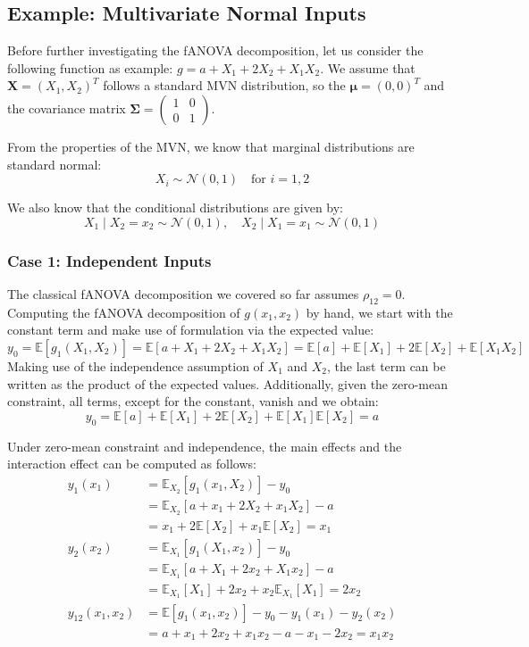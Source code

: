 \subsection{Example: Multivariate Normal Inputs}

Before further investigating the fANOVA decomposition, let us consider the following function as example: \(g = a + X_1 + 2X_2 + X_1 X_2\). We assume that $\boldsymbol{X} = (X_1, X_2)^T$ follows a standard MVN distribution, so the $\boldsymbol{\mu} = (0, 0)^T$ and the covariance matrix $\boldsymbol{\Sigma} = \begin{pmatrix} 1 & 0 \\ 0 & 1 \end{pmatrix}$.

From the properties of the MVN, we know that marginal distributions are standard normal:
\[
X_i \sim \mathcal{N}(0, 1) \quad \text{for } i = 1, 2
\]

We also know that the conditional distributions are given by:
\[
X_1 \mid X_2 = x_2 \sim \mathcal{N}(0, 1), \quad
X_2 \mid X_1 = x_1 \sim \mathcal{N}(0, 1)
\]

\subsubsection*{Case 1: Independent Inputs}
The classical fANOVA decomposition we covered so far assumes $\rho_{12} = 0$. Computing the fANOVA decomposition of $g(x_1, x_2)$ by hand, we start with the constant term and make use of formulation via the expected value:
\[
y_0 = \mathbb{E}[g_{1}(X_1, X_2)] = \mathbb{E}[a + X_1 + 2X_2 + X_1X_2] = \mathbb{E}[a] + \mathbb{E}[X_1] + 2\mathbb{E}[X_2] + \mathbb{E}[X_1X_2]
\]
Making use of the independence assumption of $X_1$ and $X_2$, the last term can be written as the product of the expected values. Additionally, given the zero-mean constraint, all terms, except for the constant, vanish and we obtain:
\[
y_0 = \mathbb{E}[a] + \mathbb{E}[X_1] + 2\mathbb{E}[X_2] + \mathbb{E}[X_1]\mathbb{E}[X_2] = a
\]

Under zero-mean constraint and independence, the main effects and the interaction effect can be computed as follows:
\begin{align*}
y_1(x_1) &= \mathbb{E}_{X_2}[g_{1}(x_1, X_2)] - y_0 \\
&= \mathbb{E}_{X_2}[a + x_1 + 2X_2 + x_1X_2] - a \\
&= x_1 + 2\mathbb{E}[X_2] + x_1\mathbb{E}[X_2] = x_1\\
y_2(x_2) &= \mathbb{E}_{X_1}[g_{1}(X_1, x_2)] - y_0 \\
&= \mathbb{E}_{X_1}[a + X_1 + 2x_2 + X_1x_2] - a \\
&= \mathbb{E}_{X_1}[X_1] + 2x_2 + x_2\mathbb{E}_{X_1}[X_1] = 2x_2\\
y_{12}(x_1, x_2) &= \mathbb{E}[g_{1}(x_1, x_2)] - y_0 - y_1(x_1) - y_2(x_2) \\
&= a + x_1 + 2x_2 + x_1x_2 - a - x_1 - 2x_2 = x_1x_2
\end{align*}

